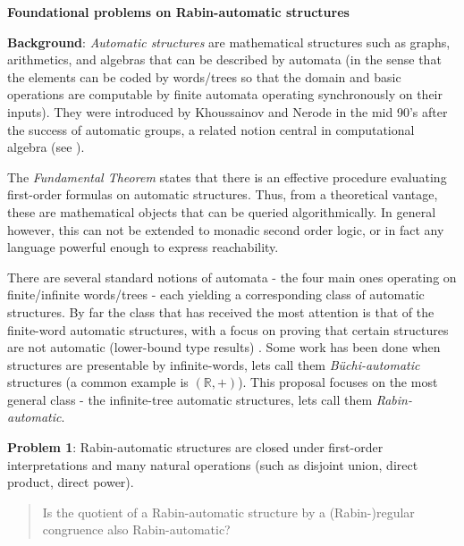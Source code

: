 \documentclass{article}
\theoremstyle{plain} \numberwithin{equation}{section}
\theoremstyle{definition}
\begin{document}
\thispagestyle{fancy}

\noindent

\begin{center}
{\bf Foundational problems on Rabin-automatic structures}
\end{center}

{\bf Background}: {\it Automatic structures} are mathematical structures such as graphs, arithmetics, and algebras that can be described by automata (in the sense that the elements can be coded by words/trees so that the domain and basic operations are computable by finite automata operating synchronously on their inputs).  They were introduced by Khoussainov and Nerode in the mid 90's after the success of automatic groups, a related notion central in computational algebra (see \cite{CEHLPT92}).

\smallskip

The {\it Fundamental Theorem} states that there is an effective procedure evaluating first-order formulas on automatic structures. Thus, from a theoretical vantage, these are mathematical objects that can be queried algorithmically. In general however, this can not be extended to monadic second order logic, or in fact any language powerful enough to express reachability.

\smallskip

There are several standard notions of automata - the four main ones operating on finite/infinite words/trees - each yielding a corresponding class of automatic structures. By far the class that has received the most attention is that of the finite-word automatic structures, with a focus on proving that certain structures are not automatic (lower-bound type results) \cite{KhNe95, BlGr00, Delh04,Rubi04, KNRS04}. Some work has been done when structures are presentable by infinite-words, lets call them {\em B{\"u}chi-automatic} structures
(a common example is $(\mathbb{R},+)$). This proposal focuses on the most general class - the infinite-tree automatic structures, lets call them {\em Rabin-automatic}.

\bigskip

{\bf Problem 1}:  Rabin-automatic structures are closed under first-order interpretations and many natural operations (such as disjoint union, direct product, direct power).

\begin{quote}
Is the quotient of a Rabin-automatic structure by a (Rabin-)regular congruence also Rabin-automatic?
\end{quote}
\end{document}
